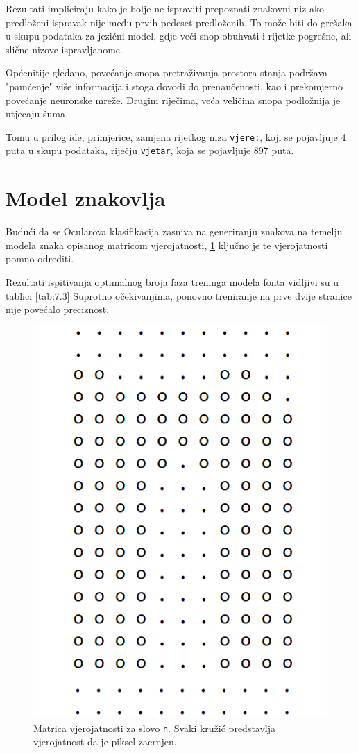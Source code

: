 \documentclass[zavrsnirad]{fer}
\begin{document}
Rezultati impliciraju kako je bolje ne ispraviti prepoznati znakovni niz ako predloženi ispravak nije među prvih pedeset predloženih. To može biti do grešaka u skupu podataka za jezični model, gdje veći snop obuhvati i rijetke pogrešne, ali slične nizove ispravljanome. 

Općenitije gledano, povećanje snopa pretraživanja prostora stanja podržava "pamćenje" više informacija i stoga dovodi do prenaučenosti, kao i prekomjerno povećanje neuronske mreže. Drugim riječima, veća veličina snopa podložnija je utjecaju šuma. 

Tomu u prilog ide, primjerice, zamjena rijetkog niza \texttt{vjere:}, koji se pojavljuje 4 puta u skupu podataka, riječju \texttt{vjetar}, koja se pojavljuje 897 puta. 

\section{Model znakovlja}

\begin{multicols}{2}
	
Budući da se Ocularova klasifikacija zasniva na generiranju znakova na temelju modela znaka opisanog matricom vjerojatnosti, \ref{slk:matrica} ključno je te vjerojatnosti pomno odrediti.

Rezultati ispitivanja optimalnog broja faza treninga modela fonta vidljivi su u tablici \ref{tab:7.3}  Suprotno očekivanjima, ponovno treniranje na prve dvije stranice nije povećalo preciznost.

	\columnbreak
	
\begin{figure}[H]
	\centering
	\includegraphics[width=0.6\linewidth]{Figures/letter-matrix.png} 
	\caption{Matrica vjerojatnosti za slovo \texttt{n}. Svaki kružić predstavlja vjerojatnost da je piksel zacrnjen.}
	\label{slk:matrica}
\end{figure}

\end{multicols}
\end{document}

